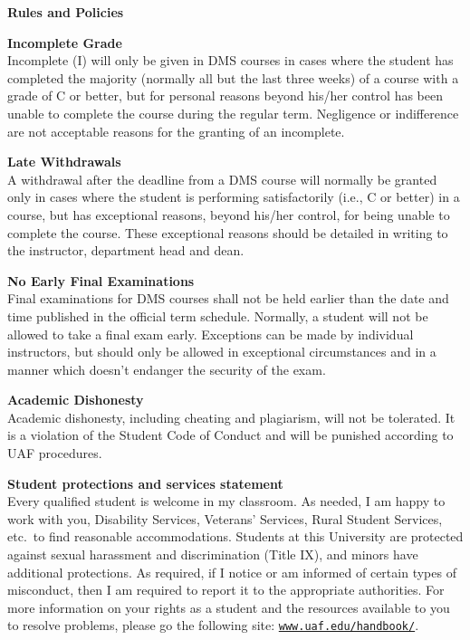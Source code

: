 \documentclass[12pt]{article}
\renewcommand{\emph}[1]{\textsf{\textbf{#1}}}
\newcommand{\localhead}[1]{\par\smallskip\textbf{#1} \smallskip\nobreak\\}%
\def\heading#1{\localhead{\large\emph{#1}}}
\def\subheading#1{\localhead{\emph{#1}}}
\begin{document}
\heading{Rules and Policies}
\vskip -20pt

\subheading{Incomplete Grade} 
Incomplete (I) will only be given in
  DMS courses in cases where
  the student has completed the majority (normally all but the last
  three weeks) of a course with a grade of C or better, but for
  personal reasons beyond his/her control has been unable to complete
  the course during the regular term. Negligence or indifference are
  not acceptable reasons for the granting of an incomplete. 

\subheading{Late Withdrawals} 
A withdrawal after the deadline from a DMS course will
  normally be granted only in cases where the student is performing
  satisfactorily (i.e., C or better) in a course, but has exceptional
  reasons, beyond his/her control, for being unable to complete the
  course. These exceptional reasons should be detailed in writing to
  the instructor, department head and dean.

\subheading{No Early Final Examinations}
Final examinations for DMS
  courses shall not be held earlier than the date and time published
  in the official term schedule. Normally, a student will not be
  allowed to take a final exam early. Exceptions can be made by
  individual instructors, but should only be allowed in exceptional
  circumstances and in a manner which doesn't endanger the security of
  the exam.

\subheading{Academic Dishonesty}
Academic dishonesty, including cheating and plagiarism, will not
be tolerated.  It is a violation of the Student Code of Conduct
and will be punished according to UAF procedures.


\subheading{Student protections and services statement}
Every qualified student is welcome in my classroom.  As needed, I am happy to work with you, Disability Services, Veterans' Services, Rural Student Services, etc.~to find reasonable accommodations.  Students at this University are protected against sexual harassment and discrimination (Title IX), and minors have additional protections.  As required, if I notice or am informed of certain types of misconduct, then I am required to report it to the appropriate authorities.  For more information on your rights as a student and the resources available to you to resolve problems, please go the following site: \href{https://www.uaf.edu/handbook/}{\texttt{www.uaf.edu/handbook/}}.
\end{document}
